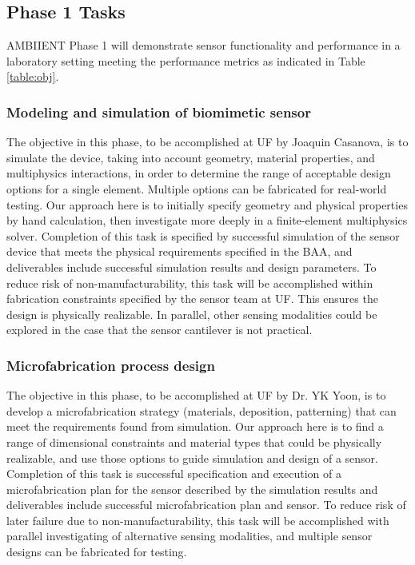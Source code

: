 \subsection{Phase 1 Tasks}

AMBIIENT Phase 1 will demonstrate sensor functionality and performance in a laboratory
setting meeting the performance metrics as indicated in Table \ref{table:obj}. 

\subsubsection{Modeling and simulation of biomimetic sensor}\label{sec:p1:em}

The objective in this phase, to be accomplished at UF by Joaquin Casanova, is to simulate the device, taking into account geometry, material properties, and multiphysics interactions, in order to determine the range of acceptable design options for a single element. Multiple options can be fabricated for real-world testing. Our approach here is to initially specify geometry and physical properties by hand calculation, then investigate more deeply in a finite-element multiphysics solver. Completion of this task is specified by successful simulation of the sensor device that meets the physical requirements specified in the BAA, and deliverables include successful simulation results and design parameters. To reduce risk of non-manufacturability, this task will be accomplished within fabrication constraints specified by the sensor team at UF. This ensures the design is physically realizable. In parallel, other sensing modalities could be explored in the case that the sensor cantilever is not practical.

\subsubsection{Microfabrication process design}\label{sec:p1:mf}

The objective in this phase, to be accomplished at UF by Dr. YK Yoon, is to develop a microfabrication strategy (materials, deposition, patterning) that can meet the requirements found from simulation. Our approach here is to find a range of dimensional constraints and material types that could be physically realizable, and use those options to guide simulation and design of a sensor. Completion of this task is successful specification and execution of a microfabrication plan for the sensor described by the simulation results and deliverables include successful microfabrication plan and sensor. To reduce risk of later failure due to non-manufacturability, this task will be accomplished with parallel investigating of alternative sensing modalities, and multiple sensor designs can be fabricated for testing.

